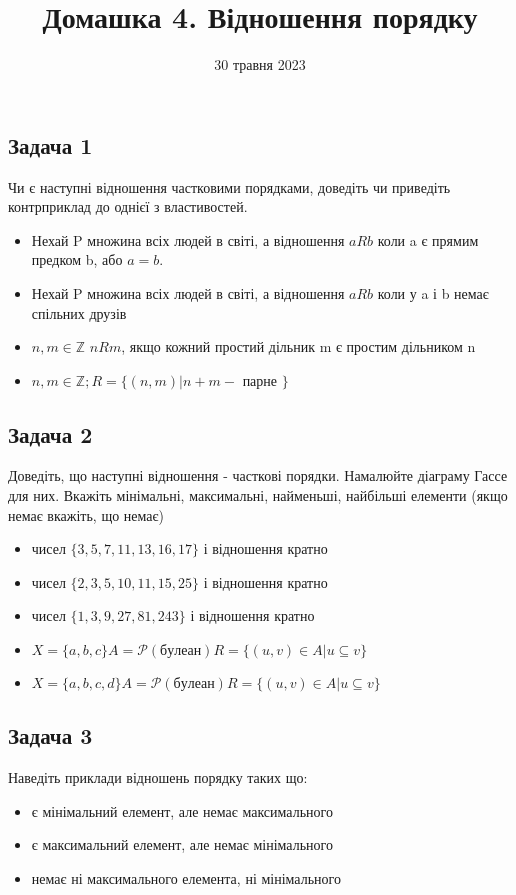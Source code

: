 \documentclass{article}
\begin{document}
\title{Домашка 4. Відношення порядку}
\date{30 травня 2023}

\maketitle

\subsection*{Задача 1}
Чи є наступні відношення частковими порядками, доведіть чи приведіть контрприклад до однієї з властивостей.
\begin{itemize}
    \item Нехай P множина всіх людей в світі, а відношення $aRb$ коли a є прямим предком b, або $a=b$.
    \item Нехай P множина всіх людей в світі, а відношення $aRb$ коли у a і b немає спільних друзів
    \item $n,m \in \mathbb{Z}$ $nRm$, якщо кожний простий дільник m є простим дільником n
    \item $n,m \in \mathbb{Z}; R = \{(n,m)|n+m -$ парне $\}$
\end{itemize}

\subsection*{Задача 2}
Доведіть, що наступні відношення - часткові порядки. Намалюйте діаграму Гассе для них. Вкажіть мінімальні, максимальні, найменьші, найбільші елементи (якщо немає вкажіть, що немає)
\begin{itemize}
    \item чисел $\{3, 5, 7, 11, 13, 16, 17\}$ і відношення кратно
    \item чисел $\{2, 3, 5, 10, 11, 15, 25\}$ і відношення кратно
    \item чисел $\{1, 3, 9, 27, 81, 243\}$ і відношення кратно
    \item $X=\{a,b,c\} A=\mathcal{P} (булеан)  R = \{(u,v) \in A| u \subseteq v\}$
    \item $X=\{a,b,c,d\} A=\mathcal{P} (булеан)  R = \{(u,v) \in A| u \subseteq v\}$
\end{itemize}

\subsection*{Задача 3}
Наведіть приклади відношень порядку таких що:
\begin{itemize}
    \item є мінімальний елемент, але немає максимального
    \item є максимальний елемент, але немає мінімального
    \item немає ні максимального елемента, ні мінімального
\end{itemize}
\end{document}
